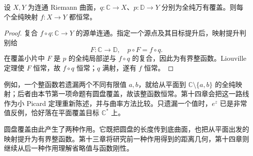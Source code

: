 \begin{proposition}[平面覆盖源到圆盘覆盖目标]\label{b3:prop:12-parabolic-to-hyperbolic}
设 \(X,Y\) 为连通 Riemann 曲面，\(q:\mathbb C\to X\)、\(p:\mathbb D\to Y\) 分别为全纯万有覆盖。则每个全纯映射 \(f:X\to Y\) 都恒常。
\end{proposition}
\begin{proof}
复合 \(f\circ q:\mathbb C\to Y\) 的源单连通。指定一个源点及其目标提升后，映射提升判别给
\[
 F:\mathbb C\to\mathbb D,\quad p\circ F=f\circ q.
\]
在覆盖小片中 \(F\) 是 \(p\) 的全纯局部逆与 \(f\circ q\) 的复合，因此为有界整函数。Liouville 定理使 \(F\) 恒常，故 \(f\circ q\) 恒常；\(q\) 满射，遂有 \(f\) 恒常。
\end{proof}
例如，一个整函数若遗漏两个不同有限值 \(a,b\)，就给从平面到 \(\mathbb C\setminus\{a,b\}\) 的全纯映射；后者由本节第一项命题有圆盘覆盖，故该整函数恒常。第十四章会把这一路线作为小 Picard 定理重新陈述，并与曲率方法比较。只遗漏一个值时，\(e^z\) 已是非常值反例，恰好落在平面覆盖目标 \(\mathbb C^*\) 上。

\ProseParagraphBreak
圆盘覆盖由此产生了两种作用。它既把圆盘的长度传到底曲面，也把从平面出发的映射提升为有界整函数。第十三章将研究前一种作用得到的距离几何，第十四章则继续从后一种作用理解省略值与函数刚性。

